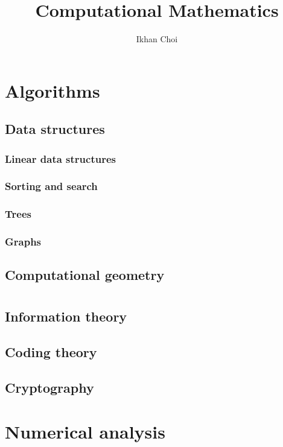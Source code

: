\documentclass{../note}
\begin{document}
\title{Computational Mathematics}
\author{Ikhan Choi}
\maketitle
\tableofcontents
\part{Algorithms}
\chapter{Data structures}
\section{Linear data structures}
\section{Sorting and search}
\section{Trees}
\section{Graphs}
\chapter{Computational geometry}




\part{}
\chapter{Information theory}
\chapter{Coding theory}
\chapter{Cryptography}




\part{Numerical analysis}
\end{document}
